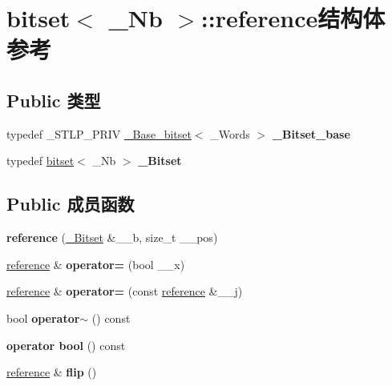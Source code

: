 \hypertarget{structbitset_1_1reference}{}\section{bitset$<$ \+\_\+\+Nb $>$\+:\+:reference结构体 参考}
\label{structbitset_1_1reference}
\subsection*{Public 类型}
\begin{DoxyCompactItemize}
\item 
\mbox{\label{structbitset_1_1reference_a89bcca9f72b9a53e041ef786d8fc63b2}} 
typedef \+\_\+\+S\+T\+L\+P\+\_\+\+P\+R\+IV \hyperlink{struct___base__bitset}{\+\_\+\+Base\+\_\+bitset}$<$ \+\_\+\+Words $>$ {\bfseries \+\_\+\+Bitset\+\_\+base}
\item 
\mbox{\label{structbitset_1_1reference_ae9722fec09bc9aabebc712a6ba19eab3}} 
typedef \hyperlink{classbitset}{bitset}$<$ \+\_\+\+Nb $>$ {\bfseries \+\_\+\+Bitset}
\end{DoxyCompactItemize}
\subsection*{Public 成员函数}
\begin{DoxyCompactItemize}
\item 
\mbox{\label{structbitset_1_1reference_a2b449ec1f7bac1b5b93c68cb53842c1a}} 
{\bfseries reference} (\hyperlink{classbitset}{\+\_\+\+Bitset} \&\+\_\+\+\_\+b, size\+\_\+t \+\_\+\+\_\+pos)
\item 
\mbox{\label{structbitset_1_1reference_a6936d2cf7c85d51b38bc09a22499aacd}} 
\hyperlink{structbitset_1_1reference}{reference} \& {\bfseries operator=} (bool \+\_\+\+\_\+x)
\item 
\mbox{\label{structbitset_1_1reference_ae81e5e4bbc8a35caa6562960e114a11a}} 
\hyperlink{structbitset_1_1reference}{reference} \& {\bfseries operator=} (const \hyperlink{structbitset_1_1reference}{reference} \&\+\_\+\+\_\+j)
\item 
\mbox{\label{structbitset_1_1reference_aea2fa369f3118c5e148098fb8126a2a9}} 
bool {\bfseries operator$\sim$} () const
\item 
\mbox{\label{structbitset_1_1reference_a07b40e95178d295543293c965e403670}} 
{\bfseries operator bool} () const
\item 
\mbox{\label{structbitset_1_1reference_a6aeffc087b3f7311c4421b74825bbc2d}} 
\hyperlink{structbitset_1_1reference}{reference} \& {\bfseries flip} ()
\end{DoxyCompactItemize}
